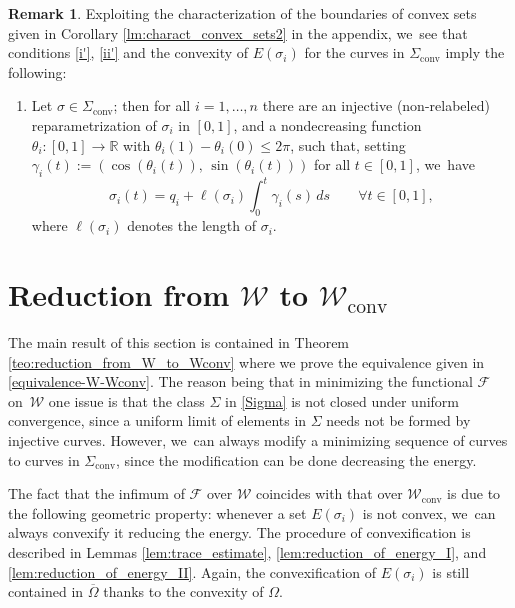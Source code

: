 \documentclass[JEP,XML,SOM,Unicode, NoFloatCountersInSection,published]{cedram}
\newcommand{\R}{\mathbb{R}}
\newcommand{\largercomp}{\mathcal W}
\let\curves\Sigma
\let\len\ell
\let\Om\Omega
\newcommand\admclassconv{{\mathcal W_\mathrm{conv}}}
\newcommand\convexcurves{\curves_\mathrm{conv}}
\theoremstyle{definition}
\newtheorem{remark}[theorem]{Remark}
\begin{document}
\begin{remark}\label{rem:condition_P}
Exploiting the characterization of the boundaries of convex sets
given in Corollary \ref{lm:charact_convex_sets2} in the appendix, we~see that conditions \ref{i'}, \ref{ii'} and the convexity of $E(\sigma_i)$ for the curves in $\convexcurves$ imply the following:

\begin{enumerate}[label=(P),wide]
\item\label{(P)} Let $\sigma\in \convexcurves$; then for all $i=1,\dots, n$ there are an injective (non-relabeled) reparametrization of $\sigma_i$ in $[0,1]$, and a
nondecreasing function $\theta_i\colon[0,1]\to\R$
with $\theta_i(1)-\theta_i(0)\le2\pi$,
such that, setting $\gamma_i(t):=(\cos(\theta_i(t)),\,\sin(\theta_i(t)))$ for all $t\in[0,1]$, we~have
\begin{equation*}
\sigma_i(t)=q_i+\len(\sigma_i)\int_0^t\gamma_i(s)\,ds\quad \quad\forall t\in[0,1],
\end{equation*}
where $\len(\sigma_i)$ denotes the length of $\sigma_i$.
\end{enumerate}
\end{remark}

\section{ Reduction from \texorpdfstring{$\largercomp$ to $\admclassconv$}{W}}
\label{sec:reduction_from_W_to_Wconv}

The main result of this section is contained in Theorem
\ref{teo:reduction_from_W_to_Wconv} where we prove the equivalence given in \eqref{equivalence-W-Wconv}. The reason being that in minimizing the functional
${\mathcal F}$ on~$\largercomp$ one issue is that the class $\curves$ in \eqref{Sigma}
is not closed under uniform convergence, since
a uniform limit of elements
in $\curves$ needs not be formed by injective curves. {However, we~can always modify a minimizing sequence of curves to curves in $\convexcurves$, since the modification can be done decreasing the energy.}

The fact that the infimum of $\mathcal F$ over $\mathcal W$ coincides with that over $\admclassconv$ is due to the following geometric property: whenever a set $E(\sigma_i)$ is not convex, we~can always convexify it reducing the energy. The procedure of convexification is described in Lemmas \ref{lem:trace_estimate}, \ref{lem:reduction_of_energy_I}, and \ref{lem:reduction_of_energy_II}. Again, the convexification of $E(\sigma_i)$ is still contained in $\overline\Omega$ thanks to the convexity of $\Om$.
\end{document}
